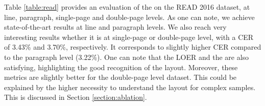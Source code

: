 Table \ref{table:read} provides an evaluation of the \modelacc{} on the READ 2016 dataset, at line, paragraph, single-page and double-page levels. As one can note, we achieve state-of-the-art results at line and paragraph levels. We also reach very interesting results whether it is at single-page or double-page level, with a CER of 3.43\% and 3.70\%, respectively. It corresponds to slightly higher CER compared to the paragraph level (3.22\%).
One can note that the LOER and the  are also satisfying, highlighting the good recognition of the layout. Moreover, these metrics are slightly better for the double-page level dataset. This could be explained by the higher necessity to understand the layout for complex samples. This is discussed in Section \ref{section:ablation}.

\begin{table*}[ht]
    \caption{Evaluation of the DAN on the test set of the READ 2016 dataset and comparison with the state-of-the-art approaches}
    \centering
\end{table*}
